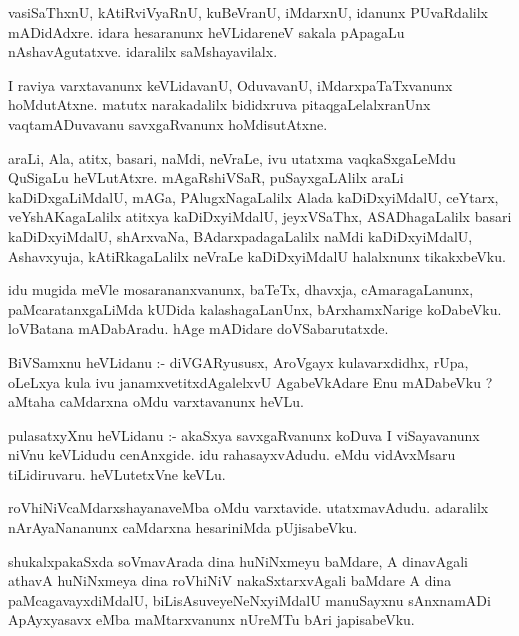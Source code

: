 \documentclass{article}
\begin{document}
\begin{mn}
vasiSaThxnU,  kAtiRviVyaRnU,  kuBeVranU,  iMdarxnU,  idanunx  PUvaRdalilx  mADidAdxre.  idara  
hesaranunx  heVLidareneV  sakala  pApagaLu  nAshavAgutatxve.  idaralilx  saMshayavilalx.
\end{mn}

\begin{mn}
I  raviya  varxtavanunx  keVLidavanU,  OduvavanU,  iMdarxpaTaTxvanunx  hoMdutAtxne.  matutx  
narakadalilx  bididxruva  pitaqgaLelalxranUnx  vaqtamADuvavanu  savxgaRvanunx  hoMdisutAtxne.
\end{mn}

\begin{mn}
araLi,  Ala,  atitx,  basari,  naMdi,  neVraLe,  ivu  utatxma  vaqkaSxgaLeMdu  QuSigaLu  heVLutAtxre.  mAgaRshiVSaR,  
puSayxgaLAlilx  araLi  kaDiDxgaLiMdalU,  mAGa,  PAlugxNagaLalilx  Alada  kaDiDxyiMdalU,  ceYtarx,  veYshAKagaLalilx  
atitxya  kaDiDxyiMdalU,  jeyxVSaThx,  ASADhagaLalilx  basari  kaDiDxyiMdalU,  shArxvaNa,  BAdarxpadagaLalilx  naMdi  
kaDiDxyiMdalU,  Ashavxyuja,  kAtiRkagaLalilx  neVraLe  kaDiDxyiMdalU  halalxnunx  tikakxbeVku. 
\end{mn}

\begin{mn}
idu  mugida  meVle  mosarananxvanunx,  baTeTx,  dhavxja,  cAmaragaLanunx,  paMcaratanxgaLiMda  kUDida  kalashagaLanUnx,  
bArxhamxNarige  koDabeVku.  loVBatana  mADabAradu.  hAge  mADidare  doVSabarutatxde.
\end{mn}

\begin{mn}
BiVSamxnu  heVLidanu :- diVGARyususx,  AroVgayx  kulavarxdidhx,  rUpa,  oLeLxya  kula  ivu  
janamxvetitxdAgalelxvU  AgabeVkAdare  Enu  mADabeVku ?  aMtaha  caMdarxna  oMdu  varxtavanunx  heVLu.
\end{mn}

\begin{mn}
pulasatxyXnu  heVLidanu :-  akaSxya  savxgaRvanunx  koDuva  I  viSayavanunx  niVnu  keVLidudu  
cenAnxgide.  idu  rahasayxvAdudu.  eMdu  vidAvxMsaru  tiLidiruvaru.  heVLutetxVne  keVLu.
\end{mn}

\begin{mn}
roVhiNiVcaMdarxshayanaveMba  oMdu  varxtavide.  utatxmavAdudu.  adaralilx  nArAyaNananunx  
caMdarxna  hesariniMda  pUjisabeVku.
\end{mn}

\begin{mn}
shukalxpakaSxda  soVmavArada  dina  huNiNxmeyu  baMdare,  A  dinavAgali  athavA  huNiNxmeya  dina  
roVhiNiV  nakaSxtarxvAgali  baMdare  A  dina  paMcagavayxdiMdalU,  biLisAsuveyeNeNxyiMdalU  
manuSayxnu  sAnxnamADi  ApAyxyasavx  eMba  maMtarxvanunx  nUreMTu bAri  japisabeVku.
\end{mn}
\end{document}
